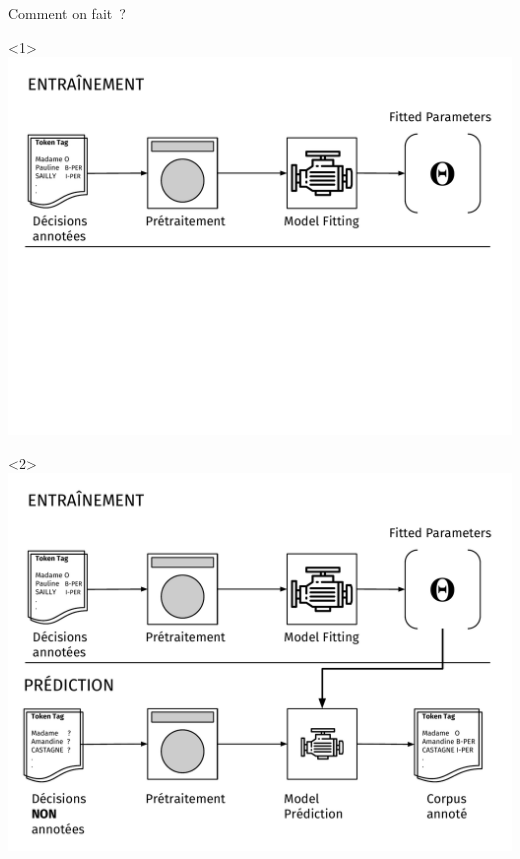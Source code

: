 \documentclass[10pt]{beamer}
\begin{document}
\begin{frame}{Comment on fait~?}
\begin{onlyenv}<1>\vspace*{\fill}\includegraphics[width=1\linewidth]{"img/flow_ds"}\vspace*{\fill}\end{onlyenv}		\begin{onlyenv}\vspace*{\fill}\includegraphics[width=1\linewidth]{"img/flow_ds2"}\vspace*{\fill}\end{onlyenv}
\end{frame}
\end{document}
